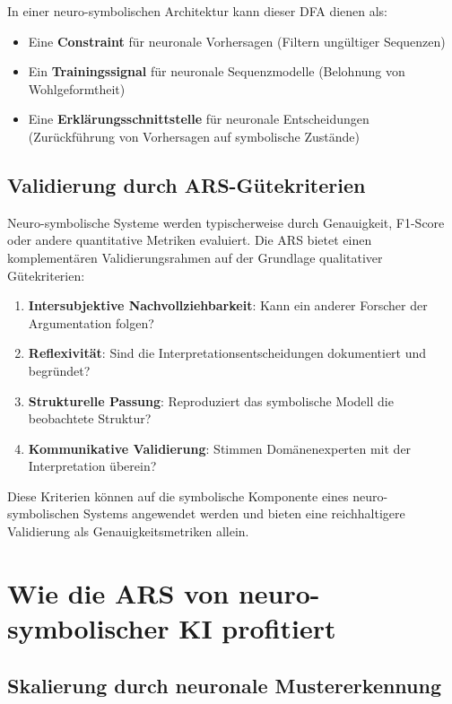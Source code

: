 \documentclass[12pt,a4paper]{article}
\begin{document}
In einer neuro-symbolischen Architektur kann dieser DFA dienen als:

\begin{itemize}
    \item Eine \textbf{Constraint} für neuronale Vorhersagen (Filtern ungültiger Sequenzen)
    \item Ein \textbf{Trainingssignal} für neuronale Sequenzmodelle (Belohnung von Wohlgeformtheit)
    \item Eine \textbf{Erklärungsschnittstelle} für neuronale Entscheidungen (Zurückführung von Vorhersagen auf symbolische Zustände)
\end{itemize}

\subsection{Validierung durch ARS-Gütekriterien}

Neuro-symbolische Systeme werden typischerweise durch Genauigkeit, F1-Score oder 
andere quantitative Metriken evaluiert. Die ARS bietet einen komplementären 
Validierungsrahmen auf der Grundlage qualitativer Gütekriterien:

\begin{enumerate}
    \item \textbf{Intersubjektive Nachvollziehbarkeit}: Kann ein anderer Forscher 
    der Argumentation folgen?
    \item \textbf{Reflexivität}: Sind die Interpretationsentscheidungen dokumentiert 
    und begründet?
    \item \textbf{Strukturelle Passung}: Reproduziert das symbolische Modell die 
    beobachtete Struktur?
    \item \textbf{Kommunikative Validierung}: Stimmen Domänenexperten mit der 
    Interpretation überein?
\end{enumerate}

Diese Kriterien können auf die symbolische Komponente eines neuro-symbolischen 
Systems angewendet werden und bieten eine reichhaltigere Validierung als 
Genauigkeitsmetriken allein.

\section{Wie die ARS von neuro-symbolischer KI profitiert}

\subsection{Skalierung durch neuronale Mustererkennung}
\end{document}

